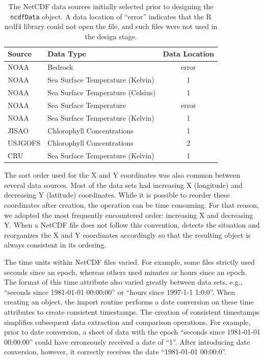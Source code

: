 \documentclass[11pt]{report}
\begin{document}
\begin{table}
  \centering
  \caption{The NetCDF data sources initially selected prior to designing the \texttt{ncdfData} object.
    A data location of ``error'' indicates that the R ncdf4 library could not open the file, and such files were not used in the design stage.}
  \begin{tabular}{lp{2.6in}c}
    \toprule
     \textbf{Source}  & \textbf{Data Type} & \textbf{Data Location} \\
     \midrule
     NOAA      & Bedrock                           & error \\
     NOAA      & Sea Surface Temperature (Kelvin)  & 1 \\
     NOAA      & Sea Surface Temperature (Celsius) & 1 \\
     NOAA      & Sea Surface Temperature           & error \\
     NOAA      & Sea Surface Temperature (Kelvin)  & 1 \\
     JISAO     & Chlorophyll Concentrations        & 1 \\
     USJGOFS   & Chlorophyll Concentrations        & 2 \\
     CRU       & Sea Surface Temperature (Kelvin)  & 1 \\
     \bottomrule
  \end{tabular}
  \label{tab:NetCDF}
\end{table}

The sort order used for the X and Y coordinates was also common between several data sources.
Most of the data sets had increasing X (longitude) and decreasing Y (latitude) coordinates.
While it is possible to reorder these coordinates after creation, the operation can be time consuming.
For that reason, we adopted the most frequently encountered order: increasing X and decreasing Y.
When a NetCDF file does not follow this convention,  detects the situation and reorganizes the X and Y coordinates accordingly so that the resulting object is always consistent in its ordering.

The time units within NetCDF files varied.
For example, some files strictly used seconds since an epoch, whereas others used minutes or hours since an epoch.
The format of this time attribute also varied greatly between data sets, e.g., ``seconds since 1981-01-01 00:00:00'' or ``hours since 1997-1-1 1:0:0''.
When creating an  object, the import routine performs a date conversion on these time attributes to create consistent timestamps.
The creation of consistent timestamps simplifies subsequent data extraction and comparison operations.
For example, prior to date conversion, a sheet of data with the epoch ``seconds since 1981-01-01 00:00:00'' could have erroneously received a date of ``1''.
After introducing date conversion, however, it  correctly receives the date ``1981-01-01 00:00:0\textbf{}''.
\end{document}
